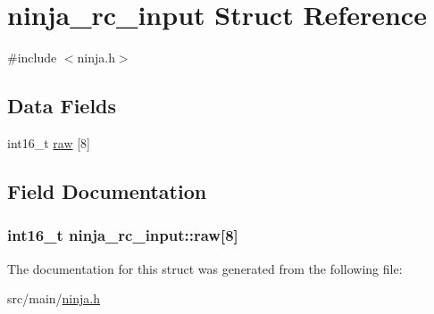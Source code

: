 \hypertarget{structninja__rc__input}{\section{ninja\+\_\+rc\+\_\+input Struct Reference}
\label{structninja__rc__input}
}


{\ttfamily \#include $<$ninja.\+h$>$}

\subsection*{Data Fields}
\begin{DoxyCompactItemize}
\item 
int16\+\_\+t \hyperlink{structninja__rc__input_abf1740b30f1ed0e8b632e07b202aaa83}{raw} \mbox{[}8\mbox{]}
\end{DoxyCompactItemize}


\subsection{Field Documentation}
\hypertarget{structninja__rc__input_abf1740b30f1ed0e8b632e07b202aaa83}{
\subsubsection[{raw}]{\setlength{\rightskip}{0pt plus 5cm}int16\+\_\+t ninja\+\_\+rc\+\_\+input\+::raw\mbox{[}8\mbox{]}}}\label{structninja__rc__input_abf1740b30f1ed0e8b632e07b202aaa83}


The documentation for this struct was generated from the following file\+:\begin{DoxyCompactItemize}
\item 
src/main/\hyperlink{ninja_8h}{ninja.\+h}\end{DoxyCompactItemize}
